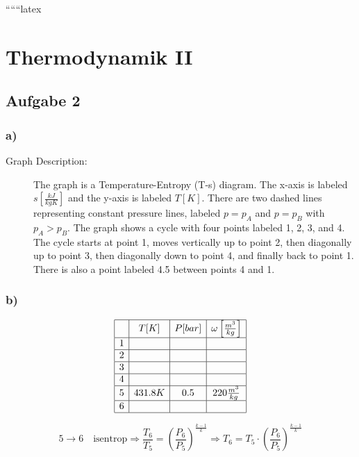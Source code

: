 
``````latex


\section*{Thermodynamik II}

\subsection*{Aufgabe 2}

\subsubsection*{a)}

\begin{description}
    \item[Graph Description:] The graph is a Temperature-Entropy (T-s) diagram. The x-axis is labeled $s \left[ \frac{kJ}{kgK} \right]$ and the y-axis is labeled $T[K]$. There are two dashed lines representing constant pressure lines, labeled $p = p_A$ and $p = p_B$ with $p_A > p_B$. The graph shows a cycle with four points labeled 1, 2, 3, and 4. The cycle starts at point 1, moves vertically up to point 2, then diagonally up to point 3, then diagonally down to point 4, and finally back to point 1. There is also a point labeled 4.5 between points 4 and 1.
\end{description}

\subsubsection*{b)}

\[
\begin{array}{|c|c|c|c|}
\hline
 & T[K] & P[bar] & \omega \left[ \frac{m^3}{kg} \right] \\
\hline
1 & & & \\
\hline
2 & & & \\
\hline
3 & & & \\
\hline
4 & & & \\
\hline
5 & 431.8K & 0.5 & 220 \frac{m^3}{kg} \\
\hline
6 & & & \\
\hline
\end{array}
\]

\[
5 \rightarrow 6 \quad \text{isentrop} \Rightarrow \frac{T_6}{T_5} = \left( \frac{P_6}{P_5} \right)^{\frac{k-1}{k}} \Rightarrow T_6 = T_5 \cdot \left( \frac{P_6}{P_5} \right)^{\frac{k-1}{k}}
\]

